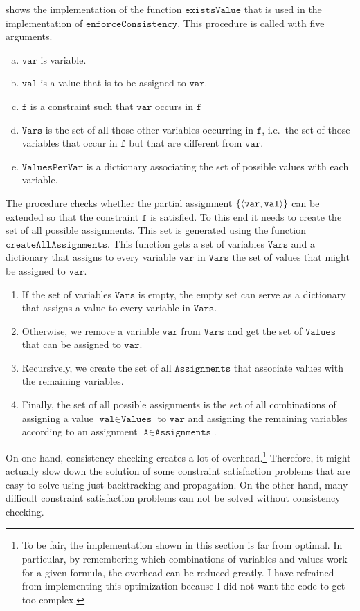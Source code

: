 \noindent
{} shows the implementation of the function $\texttt{existsValue}$ that
is used in the implementation of $\texttt{enforceConsistency}$.  This procedure is called with five arguments.
\begin{enumerate}[(a)]
\item $\texttt{var}$ is variable.
\item $\texttt{val}$ is a value that is to be assigned to $\texttt{var}$.
\item $\texttt{f}$ is a constraint such that $\texttt{var}$ occurs in $\texttt{f}$
\item $\texttt{Vars}$ is the set of all those other variables occurring in $\texttt{f}$, i.e.~the set of those
      variables that occur in $\texttt{f}$ but that are different from $\texttt{var}$. 
\item $\texttt{ValuesPerVar}$  is a dictionary associating the set of possible values with each variable.
\end{enumerate}
The procedure checks whether the partial assignment $\{ \pair(\texttt{var}, \texttt{val}) \}$ can be
extended so that the constraint $\texttt{f}$ is satisfied.  To this end it needs to create the set of all
possible assignments.  This set is generated using the function $\texttt{createAllAssignments}$.  This function
gets a set of variables $\texttt{Vars}$ and a dictionary that assigns to every variable $\texttt{var}$ in
$\texttt{Vars}$ the set of values that might be assigned to $\texttt{var}$.
\begin{enumerate}
\item If the set of variables $\texttt{Vars}$ is empty, the empty set can serve as a dictionary that 
      assigns a value to every variable in $\texttt{Vars}$.
\item Otherwise, we remove a variable $\texttt{var}$ from $\texttt{Vars}$ and get the set of $\texttt{Values}$
      that can be assigned to $\texttt{var}$.  
\item Recursively, we create the set of all $\texttt{Assignments}$ that associate values with the remaining 
      variables.
\item Finally, the set of all possible assignments is the set of all combinations of assigning a value 
      $\texttt{val} \in \texttt{Values}$ to $\texttt{var}$ and assigning the remaining variables according to 
      an assignment $\texttt{A} \in \texttt{Assignments}$.
\end{enumerate}
On one hand, consistency checking creates a lot of overhead.\footnote{
  To be fair, the implementation shown in this section is far from optimal.  In particular, by remembering which
  combinations of variables and values work for a given formula, the overhead can be reduced greatly.  I have
  refrained from implementing this optimization because I did not want the code to get too complex.
}
Therefore, it might actually slow down the
solution of some constraint satisfaction problems that are easy to solve using just backtracking and
propagation.  On the other hand, many difficult constraint satisfaction problems can not be solved
without consistency checking.

